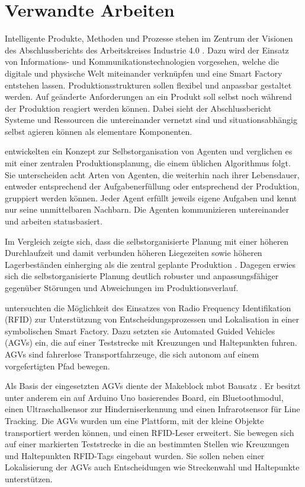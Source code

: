 \chapter{Verwandte Arbeiten}

Intelligente Produkte, Methoden und Prozesse stehen im Zentrum der Visionen des Abschlussberichts des Arbeitskreises Industrie 4.0 \parencite{arbeitsbericht}. Dazu wird der Einsatz von Informations- und Kommunikationstechnologien vorgesehen, welche die digitale und physische Welt miteinander verknüpfen und eine Smart Factory entstehen lassen.  Produktionsstrukturen sollen flexibel und anpassbar gestaltet werden. Auf geänderte Anforderungen an ein Produkt soll selbst noch während der Produktion reagiert werden können. Dabei sieht der Abschlussbericht Systeme und Ressourcen die untereinander vernetzt sind und situationsabhängig selbst agieren können als elementare Komponenten.

\textcite{agents} entwickelten ein Konzept zur Selbstorganisation von Agenten und verglichen es mit einer zentralen Produktionsplanung, die einem üblichen Algorithmus folgt. Sie unterscheiden acht Arten von Agenten, die weiterhin nach ihrer Lebensdauer, entweder entsprechend der Aufgabenerfüllung oder entsprechend der Produktion, gruppiert werden können. Jeder Agent erfüllt jeweils eigene Aufgaben und kennt nur seine unmittelbaren Nachbarn. Die Agenten kommunizieren untereinander und arbeiten statusbasiert.

Im Vergleich zeigte sich, dass die selbstorganisierte Planung mit einer höheren Durchlaufzeit und damit verbunden höheren Liegezeiten sowie höheren Lagerbeständen einherging als die zentral geplante Produktion \parencite{agents}. Dagegen erwies sich die selbstorganisierte Planung deutlich robuster und anpassungsfähiger gegenüber Störungen und Abweichungen im Produktionsverlauf.

\textcite{rfid} untersuchten die Möglichkeit des Einsatzes von Radio Frequency Identifikation (RFID) zur Unterstützung von Entscheidungsprozessen und Lokalisation in einer symbolischen Smart Factory. Dazu setzten sie Automated Guided Vehicles (AGVs) ein, die auf einer Teststrecke mit Kreuzungen und Haltepunkten fuhren. AGVs sind fahrerlose Transportfahrzeuge, die sich autonom auf einem vorgefertigten Pfad bewegen.

Als Basis der eingesetzten AGVs diente der Makeblock mbot Bausatz \parencite{rfid}. Er besitzt unter anderem ein auf Arduino Uno basierendes Board, ein Bluetoothmodul, einen Ultraschallsensor zur Hinderniserkennung und einen Infrarotsensor für Line Tracking. Die AGVs wurden um eine Plattform, mit der kleine Objekte transportiert werden können, und einen RFID-Leser erweitert. Sie bewegen sich auf einer markierten Teststrecke in die an bestimmten Stellen wie Kreuzungen und Haltepunkten RFID-Tags eingebaut wurden. Sie sollen neben einer Lokalisierung der AGVs auch Entscheidungen wie Streckenwahl und Haltepunkte unterstützen.

